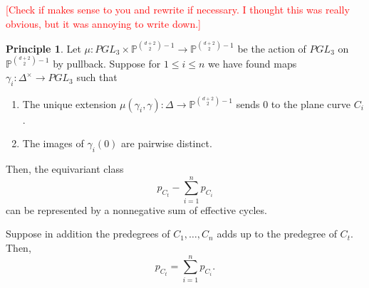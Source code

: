 \documentclass{article}
\newcommand{\rood}[1]{\textcolor{red}{[#1]}}
\theoremstyle{definition}
\newtheorem{prin}[thm]{Principle}
\newcommand{\mb}{\mathbb}
\begin{document}
\rood{Check if  makes sense to you and rewrite if necessary. I thought this was really obvious, but it was annoying to write down.}
\begin{prin}
\label{principle}
Let $\mu: PGL_3\times \mb{P}^{\binom{d+2}{2}-1}\to \mb{P}^{\binom{d+2}{2}-1}$ be the action of $PGL_3$ on $\mb{P}^{\binom{d+2}{2}-1}$ by pullback. Suppose for $1\leq i\leq n$ we have found maps $\gamma_i: \Delta^{\times}\to PGL_3$ such that
\begin{enumerate}
    \item The unique extension $\mu(\gamma_i,\gamma): \Delta\to \mb{P}^{\binom{d+2}{2}-1}$ sends 0 to the plane curve $C_i$. 
    \item
The images of $\gamma_i(0)$ are pairwise distinct. 
\end{enumerate}
Then, the equivariant class
$$p_{C_t}-\sum_{i=1}^{n}p_{C_i}$$
can be represented by a nonnegative sum of effective cycles. 

Suppose in addition the predegrees of $C_1,\ldots,C_n$ adds up to the predegree of $C_t$. Then, 
$$p_{C_t}=\sum_{i=1}^{n}p_{C_i}.$$
\end{prin}
\end{document}
